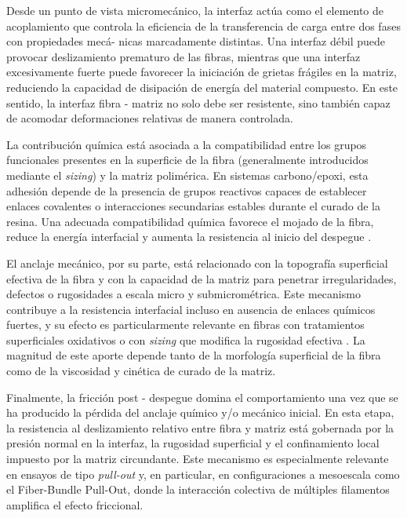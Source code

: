 Desde un punto de vista micromecánico, la interfaz actúa como el elemento de acoplamiento que
controla la eficiencia de la transferencia de carga entre dos fases con propiedades mecá- nicas
marcadamente distintas. Una interfaz débil puede provocar deslizamiento prematuro de las fibras,
mientras que una interfaz excesivamente fuerte puede favorecer la iniciación de grietas frágiles
en la matriz, reduciendo la capacidad de disipación de energía del material compuesto. En este
sentido, la interfaz fibra - matriz no solo debe ser resistente, sino también capaz de acomodar
deformaciones relativas de manera controlada.

La contribución química está asociada a la compatibilidad entre los grupos funcionales presentes
en la superficie de la fibra (generalmente introducidos mediante el \textit{sizing}) y la matriz
polimérica. En sistemas carbono/epoxi, esta adhesión depende de la presencia de grupos reactivos
capaces de establecer enlaces covalentes o interacciones secundarias estables durante el curado
de la resina. Una adecuada compatibilidad química favorece el mojado de la fibra, reduce la
energía interfacial y aumenta la resistencia al inicio del despegue
\cite{AhmadvashAghbash2024IMR, Liu2021}.

El anclaje mecánico, por su parte, está relacionado con la topografía superficial efectiva de la
fibra y con la capacidad de la matriz para penetrar irregularidades, defectos o rugosidades a
escala micro y submicrométrica. Este mecanismo contribuye a la resistencia interfacial incluso
en ausencia de enlaces químicos fuertes, y su efecto es particularmente relevante en fibras con
tratamientos superficiales oxidativos o con \textit{sizing} que modifica la rugosidad efectiva
\cite{AhmadvashAghbash2024IMR}. La magnitud de este aporte depende tanto de la morfología
superficial de la fibra como de la viscosidad y cinética de curado de la matriz.

Finalmente, la fricción post - despegue domina el comportamiento una vez que se ha producido la
pérdida del anclaje químico y/o mecánico inicial. En esta etapa, la resistencia al deslizamiento
relativo entre fibra y matriz está gobernada por la presión normal en la interfaz, la rugosidad
superficial y el confinamiento local impuesto por la matriz circundante. Este mecanismo es
especialmente relevante en ensayos de tipo \textit{pull-out} y, en particular, en configuraciones
a mesoescala como el Fiber-Bundle Pull-Out, donde la interacción colectiva de múltiples
filamentos amplifica el efecto friccional.


